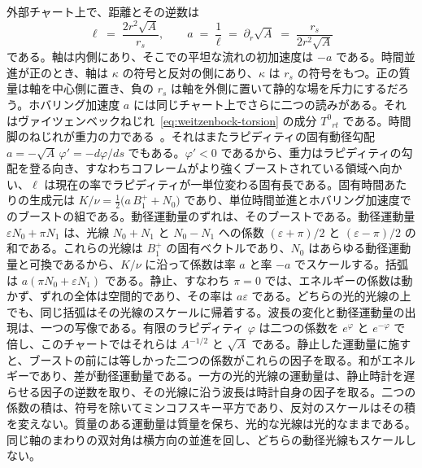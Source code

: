 \documentclass[a4paper]{article}
\begin{document}
外部チャート上で、距離とその逆数は
\[
\ell \;=\; \frac{2r^{2}\sqrt{A}}{r_{s}},\qquad
a \;=\; \frac{1}{\ell} \;=\; \partial_{r}\sqrt{A} \;=\; \frac{r_{s}}{2r^{2}\sqrt{A}}
\]
である。軸は内側にあり、そこでの平坦な流れの初加速度は \(-a\) である。時間並進が正のとき、軸は \(\kappa\) の符号と反対の側にあり、\(\kappa\) は \(r_{s}\) の符号をもつ。正の質量は軸を中心側に置き、負の \(r_{s}\) は軸を外側に置いて静的な場を斥力にするだろう。ホバリング加速度 \(a\) には同じチャート上でさらに二つの読みがある。それはヴァイツェンベックねじれ~\eqref{eq:weitzenbock-torsion} の成分 \(T^{0}{}_{rt}\) である。時間脚のねじれが重力の力である~\cite{AldrovandiPereira2013}。それはまたラピディティの固有動径勾配 \(a=-\sqrt{A}\,\varphi'=-d\varphi/ds\) でもある。\(\varphi'<0\) であるから、重力はラピディティの勾配を登る向き、すなわちコフレームがより強くブーストされている領域へ向かい、\(\ell\) は現在の率でラピディティが一単位変わる固有長である。固有時間あたりの生成元は \(K/\nu=\tfrac12\bigl(a\,B^{+}_{1}+N_{0}\bigr)\) であり、単位時間並進とホバリング加速度でのブーストの組である。動径運動量のずれは、そのブーストである。動径運動量 \(\varepsilon N_{0}+\pi N_{1}\) は、光線 \(N_{0}+N_{1}\) と \(N_{0}-N_{1}\) への係数 \((\varepsilon+\pi)/2\) と \((\varepsilon-\pi)/2\) の和である。これらの光線は \(B^{+}_{1}\) の固有ベクトルであり、\(N_{0}\) はあらゆる動径運動量と可換であるから、\(K/\nu\) に沿って係数は率 \(a\) と率 \(-a\) でスケールする。括弧は \(a(\pi N_{0}+\varepsilon N_{1})\) である。静止、すなわち \(\pi=0\) では、エネルギーの係数は動かず、ずれの全体は空間的であり、その率は \(a\varepsilon\) である。どちらの光的光線の上でも、同じ括弧はその光線のスケールに帰着する。波長の変化と動径運動量の出現は、一つの写像である。有限のラピディティ \(\varphi\) は二つの係数を \(e^{\varphi}\) と \(e^{-\varphi}\) で倍し、このチャートではそれらは \(A^{-1/2}\) と \(\sqrt{A}\) である。静止した運動量に施すと、ブーストの前には等しかった二つの係数がこれらの因子を取る。和がエネルギーであり、差が動径運動量である。一方の光的光線の運動量は、静止時計を遅らせる因子の逆数を取り、その光線に沿う波長は時計自身の因子を取る。二つの係数の積は、符号を除いてミンコフスキー平方であり、反対のスケールはその積を変えない。質量のある運動量は質量を保ち、光的な光線は光的なままである。同じ軸のまわりの双対角は横方向の並進を回し、どちらの動径光線もスケールしない。
\end{document}
